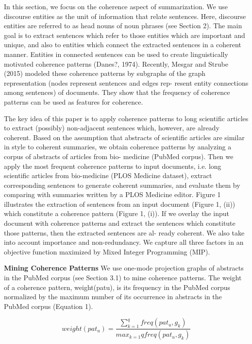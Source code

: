In this section, we focus on the coherence aspect of summarization. 
We use discourse entities as the unit of information that relate sentences. 
Here, discourse entities are referred to as head nouns of noun phrases (see Section 2). 
The main goal is to extract sentences which refer to those entities which are important and unique, and also to entities which connect the extracted sentences in a coherent manner. 
Entities in connected sentences can be used to create linguistically motivated coherence patterns (Danes?, 1974). 
Recently, Mesgar and Strube (2015) modeled these coherence patterns by subgraphs of the graph representation (nodes represent sentences and edges rep- resent entity connections among sentences) of documents. 
They show that the frequency of coherence patterns can be used as features for coherence.


The key idea of this paper is to apply coherence patterns to long scientific articles to extract (possibly) non-adjacent sentences which, however, are already coherent. 
Based on the assumption that abstracts of scientific articles are similar in style to coherent summaries, we obtain coherence patterns by analyzing a corpus of abstracts of articles from bio- medicine (PubMed corpus). 
Then we apply the most frequent coherence patterns to input documents, i.e. long scientific articles from bio-medicine (PLOS Medicine dataset), extract corresponding sentences to generate coherent summaries, and evaluate them by comparing with summaries written by a PLOS Medicine editor. 
Figure 1 illustrates the extraction of sentences from an input document (Figure 1, (ii)) which constitute a coherence pattern (Figure 1, (i)).  
If we overlay the input document with coherence patterns and extract the sentences which constitute those patterns, then the extracted sentences are al- ready coherent. We also take into account importance and non-redundancy. We capture all three factors in an objective function maximized by Mixed Integer Programming (MIP).

\textbf{Mining Coherence Patterns}
We use one-mode projection graphs of abstracts in the PubMed corpus (see Section 3.1) to mine coherence patterns. 
The weight of a coherence pattern, weight(patu), is its frequency in the PubMed corpus normalized by the maximum number of its occurrence in abstracts in the PubMed corpus (Equation 1). 

\begin{equation}
weight(pat_u) = \frac{\sum_{k=1}^{q}{freq(pat_u,g_k)}}{max_{k=1}{q}{freq(pat_u,g_k)}}
\end{equation}

